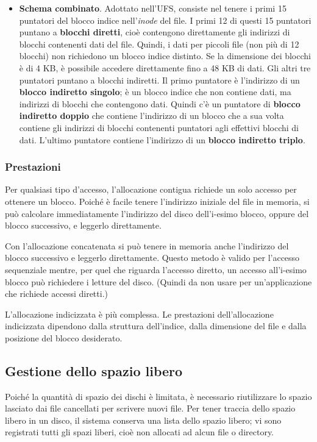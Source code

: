 \documentclass[11pt,a4paper]{article}
\begin{document}
{\begin{itemize}
  \item \textbf{Schema combinato}. Adottato nell'UFS, consiste nel tenere i primi 15 puntatori del blocco indice nell'\emph{inode} del file. I primi 12 di que­sti 15 puntatori puntano a \textbf{blocchi diretti}, cioè contengono direttamente gli indirizzi di blocchi contenenti dati del file. Quindi, i dati per piccoli file (non più di 12 bloc­chi) non richiedono un blocco indice distinto. Se la dimensione dei blocchi è di 4 KB, è possibile accedere direttamente fino a 48 KB di dati. Gli altri tre puntatori puntano a blocchi indiretti. Il primo puntatore è l'indirizzo di un \textbf{blocco in­diretto singolo}; è un blocco indice che non contiene dati, ma indirizzi di blocchi che contengono dati. Quindi c'è un puntatore di \textbf{blocco indiretto doppio} che contiene l'indirizzo di un blocco che a sua volta contiene gli indirizzi di blocchi contenenti puntatori agli effettivi blocchi di dati. L'ultimo puntatore contiene l'indi­rizzo di un \textbf{blocco indiretto triplo}.
\end{itemize}

\subsubsection{Prestazioni}
Per qualsiasi tipo d'accesso, l'allocazione contigua richiede un solo accesso per ottene­re un blocco. Poiché è facile tenere l'indirizzo iniziale del file in memoria, si può calcolare
immediatamente l'indirizzo del disco dell'i-esimo blocco, oppure del blocco successivo, e
leggerlo direttamente.

Con l'allocazione concatenata si può tenere in memoria anche l'indirizzo del blocco succes­sivo e leggerlo direttamente. Questo metodo è valido per l'accesso sequenziale mentre, per quel che riguarda l'accesso diretto, un accesso all'i-esimo blocco può richiedere i letture del disco. (Quindi da non usare per un'applicazione che richiede accessi diretti.)

L'allocazione indicizzata è più complessa. Le pre­stazioni dell'allocazione indicizzata dipendono dalla struttura dell'indice, dalla dimensione del file e dalla posizione del blocco desiderato.

\subsection{Gestione dello spazio libero}
Poiché la quantità di spazio dei dischi è limitata, è necessario riutilizzare lo spazio lasciato
dai file cancellati per scrivere nuovi file. Per tener traccia dello spazio libero in un disco, il sistema conserva una lista dello spazio
libero; vi sono registrati tutti gli spazi liberi, cioè non allocati ad alcun file o directory.

}
\end{document}

